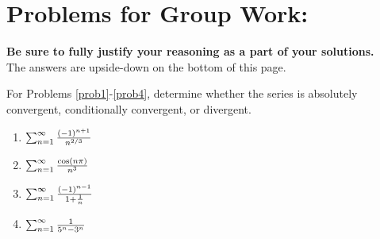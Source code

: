 \pagebreak

\section*{Problems for Group Work:}
\textbf{Be sure to fully justify your reasoning as a part of your solutions.}\\
 The answers are upside-down on the bottom of this page.

For Problems \ref{prob1}-\ref{prob4}, determine whether the series is absolutely convergent, conditionally convergent, or divergent.

\begin{enumerate}


\item \(\sum_{n=1}^\infty \frac{(-1)^{n+1}}{n^{2/3}}\) \label{prob1}
\vspace*{2.5in}

\item \(\sum_{n=1}^\infty \frac{\cos(n\pi) }{n^3}\) \label{prob2}
\vspace*{2.5in}



\item \(\sum_{n=1}^\infty \frac{(-1)^{n-1}}{1+\frac{1}{n}}\) \label{prob3}
\vspace*{2.5in}

\item \(\sum_{n=1}^\infty \frac{1}{5^n-3^n}\) \label{prob4}
\vspace*{2.5in}


\end{enumerate}

\vfill



